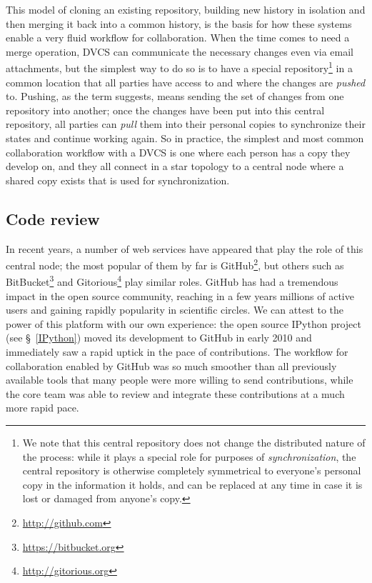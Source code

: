 \documentclass[ChapterTOCs,krantz2]{krantz} %
\theoremstyle{definition}
\begin{document}
This model of cloning an existing repository, building new history in isolation
and then merging it back into a common history, is the basis for how these
systems enable a very fluid workflow for collaboration.  When the time comes to
need a merge operation, DVCS can communicate the necessary changes even
via email attachments, but the simplest way to do so is to have a special
repository\footnote{We note that this central repository does not change the
  distributed nature of the process: while it plays a special role for purposes
  of \emph{synchronization}, the central repository is otherwise completely
  symmetrical to everyone's personal copy in the information it holds, and can
  be replaced at any time in case it is lost or damaged from anyone's copy.} in
a common location that all parties have access to and where the changes are
\emph{pushed} to.  Pushing, as the term suggests, means sending the set of
changes from one repository into another; once the changes have been put into
this central repository, all parties can \emph{pull} them into their personal
copies to synchronize their states and continue working again.  So in practice,
the simplest and most common collaboration workflow with a DVCS is one where
each person has a copy they develop on, and they all connect in a star topology
to a central node where a shared copy exists that is used for synchronization.

\subsection{Code review}

In recent years, a number of web services have appeared that play the role of
this central node; the most popular of them by far is
GitHub\footnote{\url{http://github.com}}, but others such as
BitBucket\footnote{\url{https://bitbucket.org}} and
Gitorious\footnote{\url{http://gitorious.org}} play similar roles.  GitHub has
had a tremendous impact in the open source community, reaching in a few years
millions of active users and gaining rapidly popularity in scientific circles.
We can attest to the power of this platform with our own experience: the open
source IPython project (see §~\ref{IPython}) moved its development to GitHub in
early 2010 and immediately saw a rapid uptick in the pace of contributions.
The workflow for collaboration enabled by GitHub was so much smoother than all
previously available tools that many people were more willing to send
contributions, while the core team was able to review and integrate these
contributions at a much more rapid pace.
\end{document}
